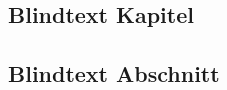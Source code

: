 \begin{appendices}

\chapter{Blindtext Kapitel}
\blindtext

\section{Blindtext Abschnitt}
\Blindtext

\end{appendices}